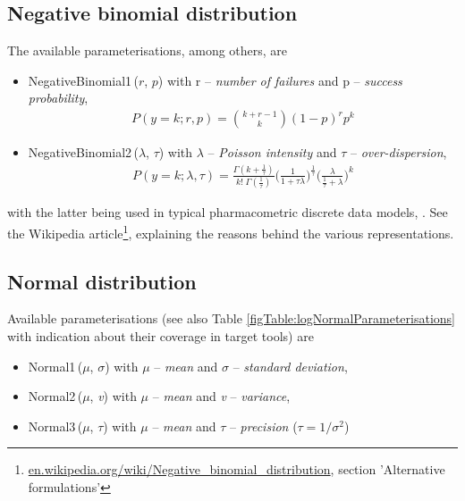 {\subsection{Negative binomial distribution} 
The available parameterisations, among others, are
\begin{itemize}
\item
NegativeBinomial1\,($r$, $p$) with r -- \emph{number of failures} and p -- \emph{success probability},
\begin{align}
P(y=k;r,p) = \binom {k+r-1}k (1-p)^r p^k \nonumber
\end{align}
\item
NegativeBinomial2\,($\lambda$, $\tau$) with $\lambda$ -- \emph{Poisson intensity} and $\tau$ -- \emph{over-dispersion},
\begin{align}
P(y=k;\lambda,\tau) = \frac{\Gamma(k + \frac{1}{\tau})}{k!\; \Gamma(\frac{1}{\tau})} \Big(\frac{1}{1+\tau \lambda} \Big)^{\frac{1}{\tau}} 
\Big(\frac{\lambda}{\frac{1}{\tau} + \lambda} \Big)^{k} \nonumber
\end{align}
\end{itemize}
with the latter being used in typical pharmacometric discrete data models, \cite{Plan:2009fk, Troconiz:2009fv}.
See the Wikipedia article\footnote{\url{en.wikipedia.org/wiki/Negative_binomial_distribution}, 
section 'Alternative formulations'}, explaining the reasons behind the various representations.

\subsection{Normal distribution}
Available parameterisations (see also Table \ref{figTable:logNormalParameterisations} 
with indication about their coverage in target tools) are
\begin{itemize}
\item
Normal1\,($\mu$, $\sigma$) with $\mu$ -- \emph{mean} and $\sigma$ -- \emph{standard deviation}, 
\item
Normal2\,($\mu$, \emph{v}) with $\mu$ -- \emph{mean} and \emph{v} -- \emph{variance},
\item
Normal3\,($\mu$, $\tau$) with $\mu$ -- \emph{mean} and $\tau$ -- \emph{precision} ($\tau=1/\sigma^2$)
\end{itemize}

}
